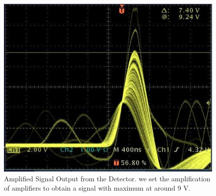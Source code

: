 \begin{figure}[ht]
	\centering
	\includegraphics[width=0.6\linewidth]{./figs/Amplifier.jpg}
	\caption{Amplified Signal Output from the Detector. we set the amplification of amplifiers to obtain a signal with maximum at around 9 V.}%
	\label{fig:Amplified}
\end{figure}
\newpage
